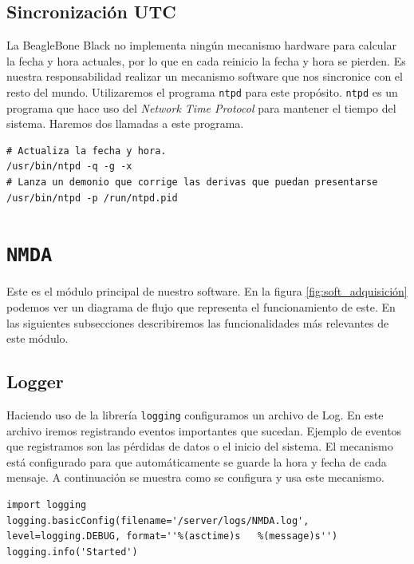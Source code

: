 	\subsection{Sincronización UTC}
		La BeagleBone Black no implementa ningún mecanismo hardware para calcular la fecha y hora actuales, por lo que en cada reinicio la
		fecha y hora se pierden. Es nuestra responsabilidad realizar un mecanismo software que nos sincronice con el resto del mundo\cite{ntpd}.
		Utilizaremos el programa \texttt{ntpd} para este propósito. \texttt{ntpd} es un programa que hace uso del 
		\emph{Network Time Protocol}\cite{ntpWiki} para mantener el tiempo del sistema. Haremos dos llamadas a este programa.
		\begin{lstlisting}
# Actualiza la fecha y hora.
/usr/bin/ntpd -q -g -x
# Lanza un demonio que corrige las derivas que puedan presentarse
/usr/bin/ntpd -p /run/ntpd.pid
		\end{lstlisting}


\section{\texttt{NMDA}}
	Este es el módulo principal de nuestro software. En la figura \ref{fig:soft_adquisición} podemos ver un diagrama de flujo que representa el
	funcionamiento de este. En las siguientes subsecciones describiremos las funcionalidades más relevantes de este módulo.
	\subsection{Logger}
		Haciendo uso de la librería \texttt{logging}\cite{py_logging} configuramos un archivo de Log. En este archivo iremos registrando eventos importantes
		que sucedan. Ejemplo de eventos que registramos son las pérdidas de datos o el inicio del sistema. El mecanismo está configurado para
		que automáticamente se guarde la hora y fecha de cada mensaje. A continuación se muestra como se configura y usa este mecanismo.
		\begin{lstlisting}
import logging
logging.basicConfig(filename='/server/logs/NMDA.log', level=logging.DEBUG, format=''%(asctime)s   %(message)s'')
logging.info('Started')
		\end{lstlisting}
